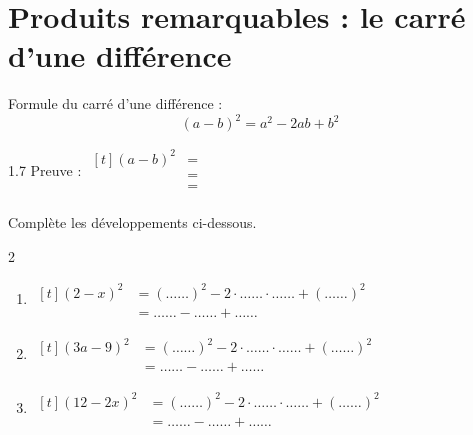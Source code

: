 \documentclass[../math2.tex]{subfiles}
\begin{document}
\newpage
\section{Produits remarquables : le carré d'une différence}

Formule du carré d'une différence :
\begin{equation*}
  \left(a-b\right)^2=a^2-2ab+b^2
\end{equation*}

\begin{spacing}{1.7}
  Preuve : $
    \begin{aligned}[t]
      \left(a-b\right)^2
       & = \\
       & = \\
       & = \\
    \end{aligned}
  $
\end{spacing}

\begin{exercise}
  Complète les développements ci-dessous.
  \begin{spacing}{2}
    \begin{enumerate}[itemsep=0.5cm]
      \item $
              \begin{aligned}[t]
                \left(2-x\right)^2 & = \left(\ldots \ldots\right)^2 - 2 \cdot  \ldots \ldots \cdot  \ldots \ldots + \left( \ldots \ldots\right)^2 \\
                                   & =  \ldots \ldots -  \ldots \ldots +  \ldots \ldots
              \end{aligned}
            $
      \item $
              \begin{aligned}[t]
                \left(3a-9\right)^2
                 & = \left( \ldots \ldots\right)^2 - 2 \cdot  \ldots \ldots \cdot  \ldots \ldots + \left( \ldots \ldots\right)^2 \\
                 & =  \ldots \ldots -  \ldots \ldots +  \ldots \ldots
              \end{aligned}
            $
      \item $
              \begin{aligned}[t]
                \left(12-2x\right)^2
                 & = \left( \ldots \ldots\right)^2 - 2 \cdot  \ldots \ldots \cdot  \ldots \ldots + \left( \ldots \ldots\right)^2 \\
                 & =  \ldots \ldots -  \ldots \ldots +  \ldots \ldots
              \end{aligned}
            $
    \end{enumerate}
  \end{spacing}
\end{exercise}
\end{document}
